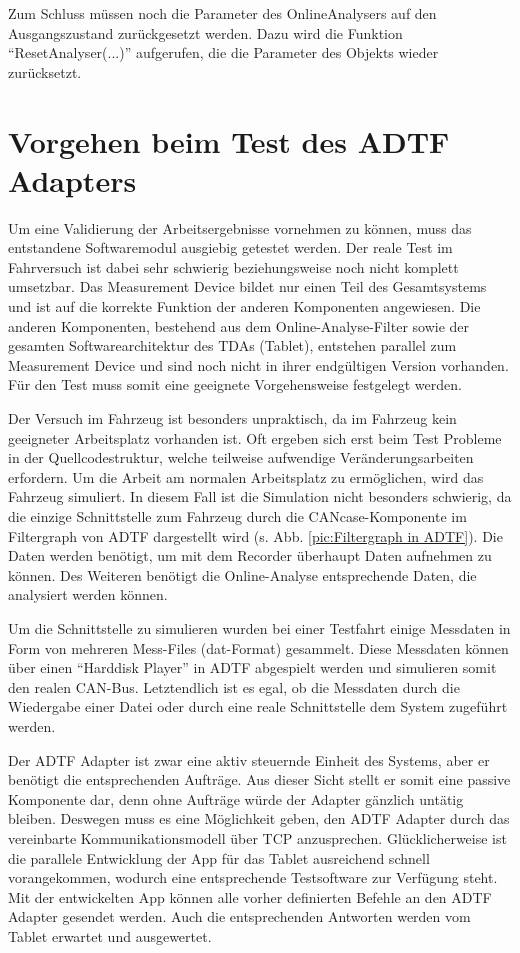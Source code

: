 \documentclass[12pt,a4paper]{report}
\begin{document}
Zum Schluss müssen noch die Parameter des OnlineAnalysers auf den Ausgangszustand zurückgesetzt werden. Dazu wird die Funktion "`ResetAnalyser(...)"' aufgerufen, die die Parameter des Objekts wieder zurücksetzt.
\section{Vorgehen beim Test des ADTF Adapters}\label{sec:Vorgehen beim Test}
Um eine Validierung der Arbeitsergebnisse vornehmen zu können, muss das entstandene Softwaremodul ausgiebig getestet werden. Der reale Test im Fahrversuch ist dabei sehr schwierig beziehungsweise noch nicht komplett umsetzbar. Das Measurement Device bildet nur einen Teil des Gesamtsystems und ist auf die korrekte Funktion der anderen Komponenten angewiesen. Die anderen Komponenten, bestehend aus dem Online-Analyse-Filter sowie der gesamten Softwarearchitektur des TDAs (Tablet), entstehen parallel zum Measurement Device und sind noch nicht in ihrer endgültigen Version vorhanden. Für den Test muss somit eine geeignete Vorgehensweise festgelegt werden.

Der Versuch im Fahrzeug ist besonders unpraktisch, da im Fahrzeug kein geeigneter Arbeitsplatz vorhanden ist. Oft ergeben sich erst beim Test Probleme in der Quellcodestruktur, welche teilweise aufwendige Veränderungsarbeiten erfordern. Um die Arbeit am normalen Arbeitsplatz zu ermöglichen, wird das Fahrzeug simuliert. In diesem Fall ist die Simulation nicht besonders schwierig, da die einzige Schnittstelle zum Fahrzeug durch die CANcase-Komponente im Filtergraph von ADTF dargestellt wird (s. Abb. \ref{pic:Filtergraph in ADTF}). Die Daten werden benötigt, um mit dem Recorder überhaupt Daten aufnehmen zu können. Des Weiteren benötigt die Online-Analyse entsprechende Daten, die analysiert werden können.

Um die Schnittstelle zu simulieren wurden bei einer Testfahrt einige Messdaten in Form von mehreren Mess-Files (dat-Format) gesammelt. Diese Messdaten können über einen "`Harddisk Player"' in ADTF abgespielt werden und simulieren somit den realen CAN-Bus. Letztendlich ist es egal, ob die Messdaten durch die Wiedergabe einer Datei oder durch eine reale Schnittstelle dem System zugeführt werden. 

Der ADTF Adapter ist zwar eine aktiv steuernde Einheit des Systems, aber er benötigt die entsprechenden Aufträge. Aus dieser Sicht stellt er somit eine passive Komponente dar, denn ohne Aufträge würde der Adapter gänzlich untätig bleiben. Deswegen muss es eine Möglichkeit geben, den ADTF Adapter durch das vereinbarte Kommunikationsmodell über TCP anzusprechen. Glücklicherweise ist die parallele Entwicklung der App für das Tablet ausreichend schnell vorangekommen, wodurch eine entsprechende Testsoftware zur Verfügung steht. Mit der entwickelten App können alle vorher definierten Befehle an den ADTF Adapter gesendet werden. Auch die entsprechenden Antworten werden vom Tablet erwartet und ausgewertet.
\end{document}

